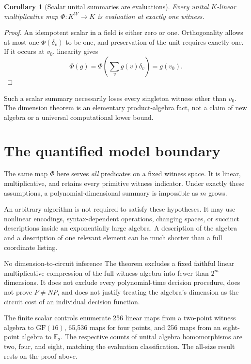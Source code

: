 \documentclass[11pt,letterpaper,oneside]{report}
\theoremstyle{komorebi}
\newtheorem{corollary}[theorem]{Corollary}
\newcommand{\F}{\mathbb F_2}
\begin{document}
\begin{corollary}[Scalar unital summaries are evaluations]\label{cor:scalar-eval}
Every unital $K$-linear multiplicative map $\Phi:K^W\to K$ is evaluation at exactly one witness.
\end{corollary}
\begin{proof}
An idempotent scalar in a field is either zero or one. Orthogonality allows at most one $\Phi(\delta_v)$ to be one, and preservation of the unit requires exactly one. If it occurs at $v_0$, linearity gives
\[
 \Phi(g)=\Phi\left(\sum_v g(v)\delta_v\right)=g(v_0).
\]
\end{proof}
Such a scalar summary necessarily loses every singleton witness other than $v_0$. The dimension theorem is an elementary product-algebra fact, not a claim of new algebra or a universal computational lower bound.

\section{The quantified model boundary}
The same map $\Phi$ here serves \emph{all} predicates on a fixed witness space. It is linear, multiplicative, and retains every primitive witness indicator. Under exactly these assumptions, a polynomial-dimensional summary is impossible as $m$ grows.

An arbitrary algorithm is not required to satisfy these hypotheses. It may use nonlinear encodings, syntax-dependent operations, changing spaces, or succinct descriptions inside an exponentially large algebra. A description of the algebra and a description of one relevant element can be much shorter than a full coordinate listing.

\begin{scopebox}{No dimension-to-circuit inference}
The theorem excludes a fixed faithful linear multiplicative compression of the full witness algebra into fewer than $2^m$ dimensions. It does not exclude every polynomial-time decision procedure, does not prove $P\ne NP$, and does not justify treating the algebra's dimension as the circuit cost of an individual decision function.
\end{scopebox}

The finite scalar controls enumerate 256 linear maps from a two-point witness algebra to $\mathrm{GF}(16)$, 65,536 maps for four points, and 256 maps from an eight-point algebra to $\F$. The respective counts of unital algebra homomorphisms are two, four, and eight, matching the evaluation classification. The all-size result rests on the proof above.
\end{document}
